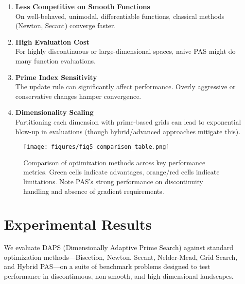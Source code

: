 \documentclass[10pt,twocolumn,letterpaper]{article}
\begin{document}
\begin{enumerate}
    \item \textbf{Less Competitive on Smooth Functions}\\
    On well-behaved, unimodal, differentiable functions, classical methods (Newton, Secant) converge faster.
    
    \item \textbf{High Evaluation Cost}\\
    For highly discontinuous or large-dimensional spaces, naive PAS might do many function evaluations.
    
    \item \textbf{Prime Index Sensitivity}\\
    The update rule can significantly affect performance. Overly aggressive or conservative changes hamper convergence.
    
    \item \textbf{Dimensionality Scaling}\\
    Partitioning each dimension with prime-based grids can lead to exponential blow-up in evaluations (though hybrid/advanced approaches mitigate this).
\end{enumerate}

\begin{figure}[t]
    \centering
    \texttt{[image: figures/fig5\_comparison\_table.png]}
    \caption{Comparison of optimization methods across key performance metrics. Green cells indicate advantages, orange/red cells indicate limitations. Note PAS's strong performance on discontinuity handling and absence of gradient requirements.}
    \label{fig:comparison_table}
\end{figure}

\section{Experimental Results}

We evaluate DAPS (Dimensionally Adaptive Prime Search) against standard optimization methods—Bisection, Newton, Secant, Nelder-Mead, Grid Search, and Hybrid PAS—on a suite of benchmark problems designed to test performance in discontinuous, non-smooth, and high-dimensional landscapes.
\end{document}
